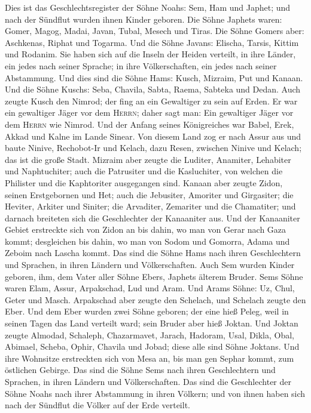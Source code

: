  Dies ist das Geschlechtsregister der Söhne Noahs: Sem,
Ham und Japhet; und nach der Sündflut wurden ihnen Kinder geboren.
 Die Söhne Japhets waren: Gomer, Magog, Madai, Javan,
Tubal, Mesech und Tiras.  Die Söhne Gomers aber:
Aschkenas, Riphat und Togarma.  Und die Söhne Javans:
Elischa, Tarsis, Kittim und Rodanim.  Sie haben sich auf
die Inseln der Heiden verteilt, in ihre Länder, ein jedes nach seiner
Sprache; in ihre Völkerschaften, ein jedes nach seiner Abstammung.
 Und dies sind die Söhne Hams: Kusch, Mizraim, Put und
Kanaan.  Und die Söhne Kuschs: Seba, Chavila, Sabta,
Raema, Sabteka und Dedan.  Auch zeugte Kusch den Nimrod;
der fing an ein Gewaltiger zu sein auf Erden.  Er war ein
gewaltiger Jäger vor dem \textsc{Herrn}; daher sagt man: Ein gewaltiger
Jäger vor dem \textsc{Herrn} wie Nimrod.  Und der Anfang
seines Königreiches war Babel, Erek, Akkad und Kalne im Lande Sinear.
 Von diesem Land zog er nach Assur aus und baute Ninive,
Rechobot-Ir und Kelach,  dazu Resen, zwischen Ninive und
Kelach; das ist die große Stadt.  Mizraim aber zeugte die
Luditer, Anamiter, Lehabiter und Naphtuchiter;  auch die
Patrusiter und die Kasluchiter, von welchen die Philister und die
Kaphtoriter ausgegangen sind.  Kanaan aber zeugte Zidon,
seinen Erstgebornen und Het;  auch die Jebusiter,
Amoriter und Girgasiter;  die Heviter, Arkiter und
Siniter;  die Arvaditer, Zemariter und die Chamatiter;
und darnach breiteten sich die Geschlechter der Kanaaniter aus.
 Und der Kanaaniter Gebiet erstreckte sich von Zidon an
bis dahin, wo man von Gerar nach Gaza kommt; desgleichen bis dahin, wo
man von Sodom und Gomorra, Adama und Zeboim nach Lascha kommt.
 Das sind die Söhne Hams nach ihren Geschlechtern und
Sprachen, in ihren Ländern und Völkerschaften.  Auch Sem
wurden Kinder geboren, ihm, dem Vater aller Söhne Ebers, Japhets älterem
Bruder.  Sems Söhne waren Elam, Assur, Arpakschad, Lud
und Aram.  Und Arams Söhne: Uz, Chul, Geter und Masch.
 Arpakschad aber zeugte den Schelach, und Schelach zeugte
den Eber.  Und dem Eber wurden zwei Söhne geboren; der
eine hieß Peleg, weil in seinen Tagen das Land verteilt ward; sein
Bruder aber hieß Joktan.  Und Joktan zeugte Almodad,
Schaleph, Chazarmavet, Jarach,  Hadoram, Usal, Dikla,
 Obal, Abimael, Scheba,  Ophir, Chavila
und Jobad; diese alle sind Söhne Joktans.  Und ihre
Wohnsitze erstreckten sich von Mesa an, bis man gen Sephar kommt, zum
östlichen Gebirge.  Das sind die Söhne Sems nach ihren
Geschlechtern und Sprachen, in ihren Ländern und Völkerschaften.
 Das sind die Geschlechter der Söhne Noahs nach ihrer
Abstammung in ihren Völkern; und von ihnen haben sich nach der Sündflut
die Völker auf der Erde verteilt.

